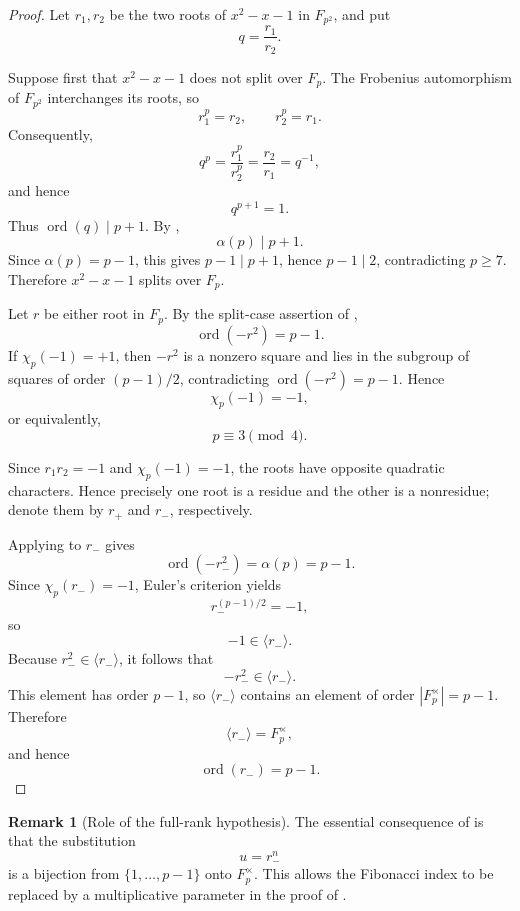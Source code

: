 \documentclass[preprint,12pt]{elsarticle}
\def\F{F}%
\numberwithin{equation}{section}
\theoremstyle{plain}
\theoremstyle{definition}
\newtheorem{remark}[theorem]{Remark}
\DeclareMathOperator{\ord}{ord}
\newcommand{\F}{\mathbb{F}}
\begin{document}
\begin{proof}
Let $r_1,r_2$ be the two roots of $x^2-x-1$ in $\F_{p^2}$, and put
\[
q=\frac{r_1}{r_2}.
\]
 
Suppose first that $x^2-x-1$ does not split over $\F_p$. The
Frobenius automorphism of $\F_{p^2}$ interchanges its roots, so
\[
r_1^p=r_2,
\qquad
r_2^p=r_1.
\]
Consequently,
\[
q^p=\frac{r_1^p}{r_2^p}
=
\frac{r_2}{r_1}
=
q^{-1},
\]
and hence
\[
q^{p+1}=1.
\]
Thus $\ord(q)\mid p+1$. By ,
\[
\alpha(p)\mid p+1.
\]
Since $\alpha(p)=p-1$, this gives $p-1\mid p+1$, hence
$p-1\mid2$, contradicting $p\ge7$. Therefore
$x^2-x-1$ splits over $\F_p$.
 
Let $r$ be either root in $\F_p$. By the split-case assertion of
,
\[
\ord(-r^2)=p-1.
\]
If $\chi_p(-1)=+1$, then $-r^2$ is a nonzero square and lies in the
subgroup of squares of order $(p-1)/2$, contradicting
$\ord(-r^2)=p-1$. Hence
\[
\chi_p(-1)=-1,
\]
or equivalently,
\[
p\equiv3\pmod4.
\]
 
Since $r_1r_2=-1$ and $\chi_p(-1)=-1$, the roots have opposite
quadratic characters. Hence precisely one root is a residue and the
other is a nonresidue; denote them by $r_+$ and $r_-$, respectively.
 
Applying  to $r_-$ gives
\[
\ord(-r_-^2)=\alpha(p)=p-1.
\]
Since $\chi_p(r_-)=-1$, Euler's criterion yields
\[
r_-^{(p-1)/2}=-1,
\]
so
\[
-1\in\langle r_-\rangle.
\]
Because $r_-^2\in\langle r_-\rangle$, it follows that
\[
-r_-^2\in\langle r_-\rangle.
\]
This element has order $p-1$, so $\langle r_-\rangle$ contains an
element of order $|\F_p^\times|=p-1$. Therefore
\[
\langle r_-\rangle=\F_p^\times,
\]
and hence
\[
\ord(r_-)=p-1.
\]
\end{proof}
 
\begin{remark}[Role of the full-rank hypothesis]
\label{rem:full-rank-role}
The essential consequence of
 is that the substitution
\[
u=r_-^n
\]
is a bijection from $\{1,\dots,p-1\}$ onto $\F_p^\times$. This
allows the Fibonacci index to be replaced by a multiplicative
parameter in the proof of .
\end{remark}
 
\end{document}
